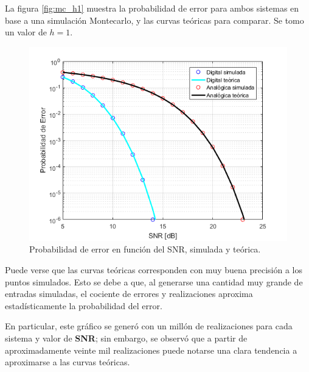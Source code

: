 La figura \ref{fig:mc_h1} muestra la probabilidad de error para ambos sistemas en base a una simulación Montecarlo, y las curvas teóricas para comparar. Se tomo un valor de $h=1$.

\begin{figure}[]
    \centering
    \includegraphics[width=\textwidth]{./Matlab/ej4h=1n=1meg.png}
    \caption{Probabilidad de error en función del SNR, simulada y teórica. }
\label{fig:prob_err}
\end{figure}

Puede verse que las curvas teóricas corresponden con muy buena precisión a los puntos simulados. Esto se debe a que, al generarse una cantidad muy grande de entradas simuladas, el cociente de errores y realizaciones aproxima estadísticamente la probabilidad del error.

En particular, este gráfico se generó con un millón de realizaciones para cada sistema y valor de \textbf{SNR}; sin embargo, se observó que a partir de aproximadamente veinte mil realizaciones puede notarse una clara tendencia a aproximarse a las curvas teóricas. 